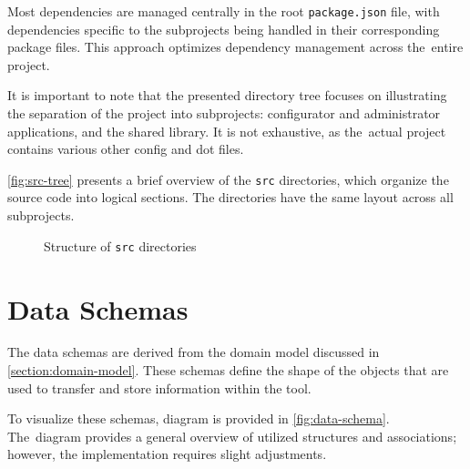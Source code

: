Most dependencies are managed centrally in the root \texttt{package.json} file, with dependencies specific to the subprojects being handled in their corresponding package files. This approach optimizes dependency management across the~entire project.

It is important to note that the presented directory tree focuses on illustrating the separation of the project into subprojects: configurator and administrator applications, and the shared library. It is not exhaustive, as the~actual project contains various other config and dot files.

\autoref{fig:src-tree} presents a brief overview of the \texttt{src} directories, which organize the source code into logical sections. The directories have the same layout across all subprojects.

\begin{figure}[h]
    \centering
    \begin{minipage}{\textwidth}
    \end{minipage}
    \caption{Structure of \texttt{src} directories}
    \label{fig:src-tree}
\end{figure}

\section{Data Schemas} \label{section:data-schemas}

The data schemas are derived from the domain model discussed in \autoref{section:domain-model}. These schemas define the shape of the objects that are used to transfer and store information within the tool. 

To visualize these schemas,  diagram is provided in \autoref{fig:data-schema}. The~diagram provides a general overview of utilized structures and associations; however, the implementation requires slight adjustments.

